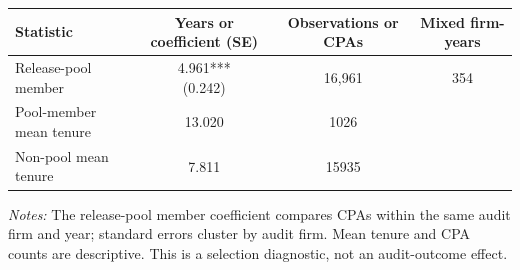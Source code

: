 \documentclass[10pt]{article}
\begin{document}
\begin{minipage}{19cm}\fontsize{10}{12}\selectfont\setlength{\tabcolsep}{4pt}\renewcommand{\arraystretch}{1.12}


\centering
{}
\begin{threeparttable}
\begin{tabular}{p{}ccc}
\toprule
Statistic & Years or coefficient (SE) & Observations or CPAs & Mixed firm-years \\
\midrule
Release-pool member & \shortstack{4.961***\\(0.242)} & 16,961 & 354 \\
Pool-member mean tenure & 13.020 & 1026 &  \\
Non-pool mean tenure & 7.811 & 15935 &  \\
\bottomrule
\end{tabular}
\begin{tablenotes}\fontsize{9}{11}\selectfont
\item \raggedright \fontsize{9}{11}\selectfont \textit{Notes:} The release-pool member coefficient compares CPAs within the same audit firm and year; standard errors cluster by audit firm. Mean tenure and CPA counts are descriptive. This is a selection diagnostic, not an audit-outcome effect.
\end{tablenotes}
\end{threeparttable}

\end{minipage}
\end{document}

